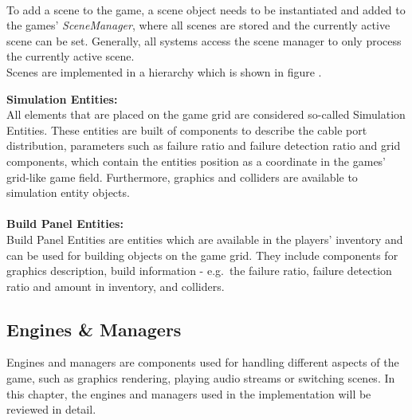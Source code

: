 \\
To add a scene to the game, a scene object needs to be instantiated and added to the games' \textit{SceneManager}, where all
scenes are stored and the currently active scene can be set.
Generally, all systems access the scene manager to only process the currently active scene.
\\

Scenes are implemented in a hierarchy which is shown in figure .

\textbf{Simulation Entities:} \\
All elements that are placed on the game grid are considered so-called Simulation Entities.
These entities are built of components to describe the cable port distribution, parameters such as failure ratio and failure detection ratio and grid components, which contain the
entities position as a coordinate in the games' grid-like game field.
Furthermore, graphics and colliders are available to simulation entity objects.
\\ \\
\textbf{Build Panel Entities:} \\
Build Panel Entities are entities which are available in the players' inventory and can be used for building objects on the game grid.
They include components for graphics description, build information - e.g.\ the failure ratio, failure detection ratio and amount in inventory,
and colliders.

\subsection{Engines \& Managers}\label{subsec:engines}
Engines and managers are components used for handling different aspects of the game, such as graphics rendering, playing audio streams
or switching scenes.
In this chapter, the engines and managers used in the implementation will be reviewed in detail.


